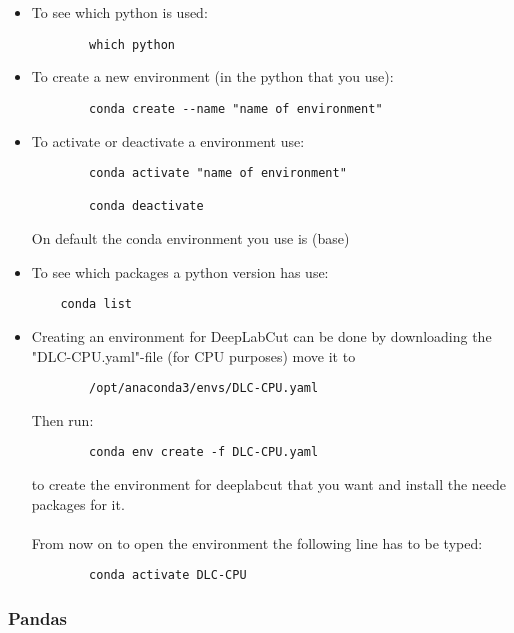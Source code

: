 \documentclass{article}
\begin{document}
\begin{itemize}
    \item To see which python is used:
    \begin{verbatim}
        which python
    \end{verbatim}

    \item To create a new environment (in the python that you use):
    \begin{verbatim}
        conda create --name "name of environment"
    \end{verbatim}
    
    \item To activate or deactivate a environment use:
    \begin{verbatim}
        conda activate "name of environment"
        
        conda deactivate
    \end{verbatim}
    On default the conda environment you use is (base)
    
    \item To see which packages a python version has use:
    \begin{verbatim}
    conda list
    \end{verbatim}
    
    \item Creating an environment for DeepLabCut can be done by downloading the "DLC-CPU.yaml"-file (for CPU purposes) move it to 
    \begin{verbatim}
        /opt/anaconda3/envs/DLC-CPU.yaml    
    \end{verbatim} 
    Then run:
    \begin{verbatim}
        conda env create -f DLC-CPU.yaml
    \end{verbatim}
    to create the environment for deeplabcut that you want and install the neede packages for it. \\ \\
    From now on to open the environment the following line has to be typed:
    \begin{verbatim}
        conda activate DLC-CPU
    \end{verbatim}
    
    
\end{itemize}



\subsubsection{Pandas}
\end{document}
